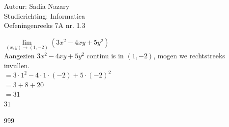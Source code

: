 \documentclass[a4paper]{article}
\begin{document}
\noindent \large Auteur: Sadia Nazary \\
\noindent \large Studierichting: Informatica\\
\noindent \large Oefeningenreeks 7A nr. 1.3\\

\medskip

\normalsize

$\lim\limits_{(x,y)\rightarrow(1,-2)}
\left(3x^2-4xy+5y^2\right)$\\

Aangezien $3x^2-4xy+5y^2$ continu is in $(1,-2)$, mogen we rechtstreeks invullen.\\

$=
3\cdot1^2-4\cdot1\cdot(-2)+5\cdot(-2)^2$\\

$=
3+8+20$\\

$=31$\\

$\boxed{31}$

\begin{thebibliography}{999}
\end{thebibliography}
\end{document}
